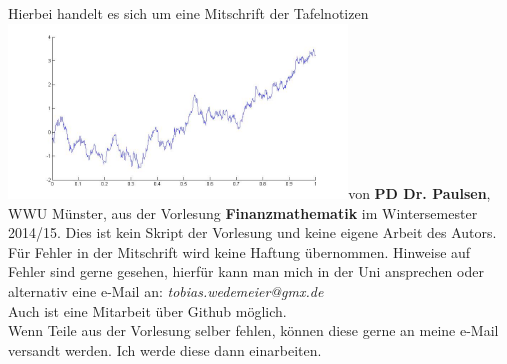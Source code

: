 

\newcommand{\vorlesung}{Finanzmathematik}
\newcommand{\Prof}{PD Dr. Paulsen}
\newcommand{\subt}{Mitschrift der Tafelnotizen\\
	\includegraphics[width=9cm, keepaspectratio]{../!config/Tazdr/Bilder/rmdgeowiener.jpg}}






\maketitle
\thispagestyle{empty}
\cleardoubleoddemptypage

\thispagestyle{empty}
\vspace*{\fill}
\begin{center}
	Hierbei handelt es sich um eine \subt von \textbf{\Prof}, WWU Münster, aus der Vorlesung \textbf{\vorlesung} im Wintersemester 2014/15. 
	Dies ist kein Skript der Vorlesung und keine eigene Arbeit des Autors.\\
	\vspace{2cm}
	Für Fehler in der Mitschrift wird keine Haftung übernommen. 
	Hinweise auf Fehler sind gerne gesehen, hierfür kann man mich in der Uni ansprechen oder alternativ eine e-Mail an: \textit{tobias.wedemeier@gmx.de}\\
	Auch ist eine Mitarbeit über Github möglich.\\
	\vspace{2cm}
	Wenn Teile aus der Vorlesung selber fehlen, können diese gerne an meine e-Mail versandt werden. 
	Ich werde diese dann einarbeiten.\\
\end{center}
\vspace*{\fill}
\cleardoubleoddemptypage


\tableofcontents
\cleardoubleoddemptypage %

